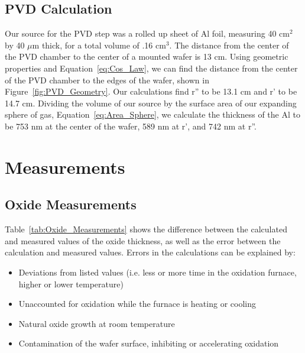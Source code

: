 \documentclass[letter,12pt]{article}
\begin{document}
	\FloatBarrier
	\subsection{PVD Calculation}
		Our source for the PVD step was a rolled up sheet of Al foil, measuring 40 cm$^2$ by 40 $\mu$m thick, for a total volume of .16 cm$^3$. The distance from the center of the PVD chamber to the center of a mounted wafer is 13 cm. Using geometric properties and Equation~\ref{eq:Cos_Law}, we can find the distance from the center of the PVD chamber to the edges of the wafer, shown in Figure~\ref{fig:PVD_Geometry}. Our calculations find r'' to be 13.1 cm and r' to be 14.7 cm. Dividing the volume of our source by the surface area of our expanding sphere of gas, Equation~\ref{eq:Area_Sphere}, we calculate the thickness of the Al to be 753 nm at the center of the wafer, 589 nm at r', and 742 nm at r''.
		
\section{Measurements}
	\subsection{Oxide Measurements}
		\FloatBarrier
		Table~\ref{tab:Oxide_Measurements} shows the difference between the calculated and measured values of the oxide thickness, as well as the error between the calculation and measured values. Errors in the calculations can be explained by:
		\begin{itemize}
			\item Deviations from listed values (i.e. less or more time in the oxidation furnace, higher or lower temperature)
			\item Unaccounted for oxidation while the furnace is heating or cooling
			\item Natural oxide growth at room temperature
			\item Contamination of the wafer surface, inhibiting or accelerating oxidation
		\end{itemize}
		
\end{document}
